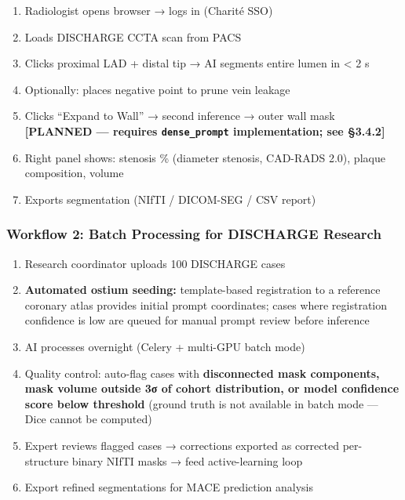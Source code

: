 \documentclass[
  11pt,
]{article}
\providecommand{\tightlist}{%
  \setlength{\itemsep}{0pt}\setlength{\parskip}{0pt}}
\begin{document}
\begin{enumerate}
\def\labelenumi{\arabic{enumi}.}
\tightlist
\item
  Radiologist opens browser → logs in (Charité SSO)
\item
  Loads DISCHARGE CCTA scan from PACS
\item
  Clicks proximal LAD + distal tip → AI segments entire lumen in
  \textless{} 2 s
\item
  Optionally: places negative point to prune vein leakage
\item
  Clicks ``Expand to Wall'' → second inference → outer wall mask
  \textbf{{[}PLANNED --- requires \texttt{dense\_prompt} implementation;
  see §3.4.2{]}}
\item
  Right panel shows: stenosis \% (diameter stenosis, CAD-RADS 2.0),
  plaque composition, volume
\item
  Exports segmentation (NIfTI / DICOM-SEG / CSV report)
\end{enumerate}

\subsubsection{Workflow 2: Batch Processing for DISCHARGE
Research}\label{workflow-2-batch-processing-for-discharge-research}

\begin{enumerate}
\def\labelenumi{\arabic{enumi}.}
\tightlist
\item
  Research coordinator uploads 100 DISCHARGE cases
\item
  \textbf{Automated ostium seeding:} template-based registration to a
  reference coronary atlas provides initial prompt coordinates; cases
  where registration confidence is low are queued for manual prompt
  review before inference
\item
  AI processes overnight (Celery + multi-GPU batch mode)
\item
  Quality control: auto-flag cases with \textbf{disconnected mask
  components, mask volume outside 3σ of cohort distribution, or model
  confidence score below threshold} (ground truth is not available in
  batch mode --- Dice cannot be computed)
\item
  Expert reviews flagged cases → corrections exported as corrected
  per-structure binary NIfTI masks → feed active-learning loop
\item
  Export refined segmentations for MACE prediction analysis
\end{enumerate}
\end{document}
